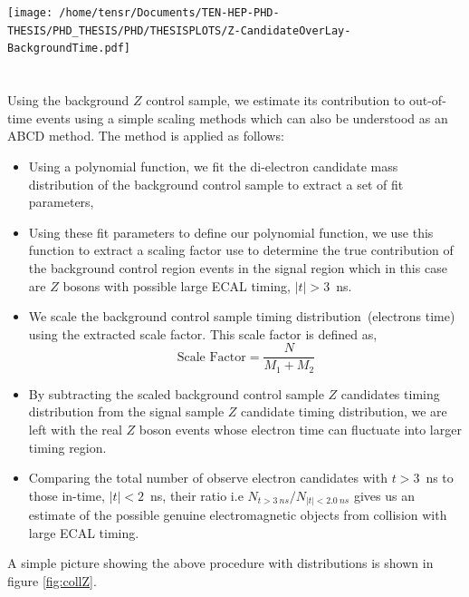 \begin{minipage}{\linewidth}
\begin{center}
{\texttt{[image: /home/tensr/Documents/TEN-HEP-PHD-THESIS/PHD\_THESIS/PHD/THESISPLOTS/Z-CandidateOverLay-BackgroundTime.pdf]}}
\label{fig:Zmass}
\end{center}
\end{minipage}

\paragraph*{}\mbox{}\\
Using the background $Z$ control sample, we estimate its contribution to out-of-time events using a simple scaling methods which can also be understood as an ABCD method. The method is applied as follows:
\begin{itemize}
\item Using a polynomial function, we fit the di-electron candidate mass distribution of the background control sample to extract a set of fit parameters,
\item Using these fit parameters to define our polynomial function, we use this function  to extract a scaling factor use to determine the true contribution of the background control region events in the signal region which in this case are $Z$ bosons with possible large ECAL timing, $|t| > 3$~ns.
\item We scale the background control sample timing distribution~(electrons time) using the extracted scale factor. This scale factor is defined as,   $$\displaystyle{\mbox{Scale Factor} = \frac{N}{M_{1} + M_{2}}}$$
\item By subtracting the scaled background control sample $Z$ candidates timing distribution from the signal sample $Z$ candidate timing distribution, we are left with the real $Z$ boson events whose electron time can fluctuate into larger timing region.
\item Comparing the total number of observe electron candidates with $t > 3$~ns to those  in-time, $|t| < 2$~ns, their ratio i.e $ N_{t > 3~ns}/ N_{|t| < 2.0~ns}$ gives us an estimate of the possible genuine electromagnetic objects from collision with large ECAL timing. 
\end{itemize}  
A simple picture showing the above procedure with distributions is shown in figure \ref{fig:collZ}.

